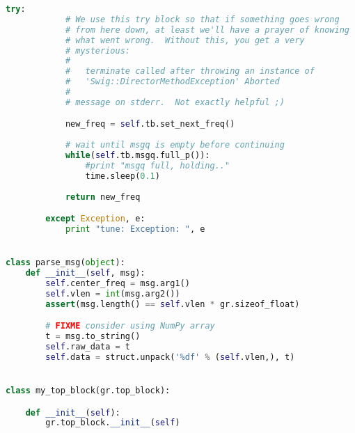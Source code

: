 \begin{lstlisting}[language=Python]
        try:
            # We use this try block so that if something goes wrong
            # from here down, at least we'll have a prayer of knowing
            # what went wrong.  Without this, you get a very
            # mysterious:
            #
            #   terminate called after throwing an instance of
            #   'Swig::DirectorMethodException' Aborted
            #
            # message on stderr.  Not exactly helpful ;)

            new_freq = self.tb.set_next_freq()
            
            # wait until msgq is empty before continuing
            while(self.tb.msgq.full_p()):
                #print "msgq full, holding.."
                time.sleep(0.1)
            
            return new_freq

        except Exception, e:
            print "tune: Exception: ", e


class parse_msg(object):
    def __init__(self, msg):
        self.center_freq = msg.arg1()
        self.vlen = int(msg.arg2())
        assert(msg.length() == self.vlen * gr.sizeof_float)

        # FIXME consider using NumPy array
        t = msg.to_string()
        self.raw_data = t
        self.data = struct.unpack('%df' % (self.vlen,), t)


class my_top_block(gr.top_block):

    def __init__(self):
        gr.top_block.__init__(self)


\end{lstlisting}
